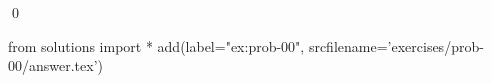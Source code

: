 
\begin{ex} 
  \label{ex:prob-00}
  
  \qed
\end{ex} 
\begin{python0}
from solutions import *
add(label="ex:prob-00",
    srcfilename='exercises/prob-00/answer.tex') 
\end{python0}
